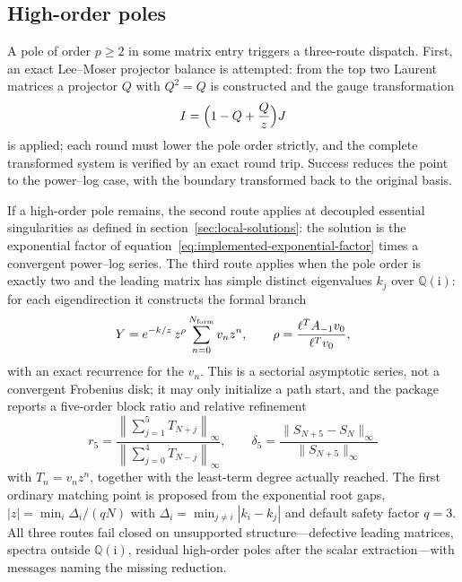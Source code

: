 \documentclass[11pt,a4paper]{article}
\newcommand{\ii}{\mathrm i}
\begin{document}
\subsection{High-order poles}
\label{sec:high-order}

A pole of order $p\ge2$ in some matrix entry triggers a three-route dispatch.
First, an exact Lee--Moser projector balance is attempted: from the top two Laurent
matrices a projector $Q$ with $Q^2=Q$ is constructed and the gauge transformation
\begin{equation}
  I=\Bigl(1-Q+\frac{Q}{z}\Bigr)J
  \label{eq:moser-balance}
\end{equation}
is applied; each round must lower the pole order strictly, and the complete transformed
system is verified by an exact round trip. Success reduces the point to the power--log
case, with the boundary transformed back to the original basis.

If a high-order pole remains, the second route applies at decoupled essential
singularities as defined in section~\ref{sec:local-solutions}: the solution is the
exponential factor of equation~\eqref{eq:implemented-exponential-factor} times
a convergent power--log series. The third route applies when the pole order is exactly two
and the leading matrix has simple distinct eigenvalues $k_j$ over $\mathbb Q(\ii)$: for
each eigendirection it constructs the formal branch
\begin{equation}
  Y=e^{-k/z}\,z^{\rho}\sum_{n=0}^{N_{\rm form}}v_nz^n,
  \qquad \rho=\frac{\ell^{T}A_{-1}v_0}{\ell^{T}v_0},
  \label{eq:formal-rank-one-ansatz}
\end{equation}
with an exact recurrence for the $v_n$. This is a sectorial asymptotic series, not a
convergent Frobenius disk; it may only initialize a path start, and the package reports a
five-order block ratio and relative refinement
\begin{equation}
  r_5=\frac{\left\|\sum_{j=1}^{5}T_{N+j}\right\|_\infty}
  {\left\|\sum_{j=0}^{4}T_{N-j}\right\|_\infty},
  \qquad
  \delta_5=\frac{\|S_{N+5}-S_N\|_\infty}{\|S_{N+5}\|_\infty}
  \label{eq:formal-five-order-test}
\end{equation}
with $T_n=v_nz^n$, together with the least-term degree actually reached. The first
ordinary matching point is proposed from the exponential root gaps,
$|z|=\min_i\Delta_i/(qN)$ with $\Delta_i=\min_{j\ne i}|k_i-k_j|$ and default safety
factor $q=3$. All three routes fail closed on unsupported structure---defective leading
matrices, spectra outside $\mathbb Q(\ii)$, residual high-order poles after the scalar
extraction---with messages naming the missing reduction.
\end{document}
